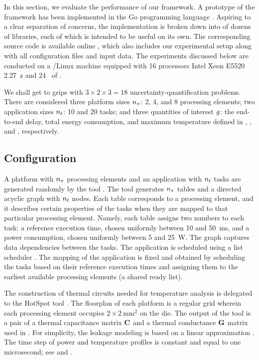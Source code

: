 In this section, we evaluate the performance of our framework. A prototype of
the framework has been implemented in the Go programming language \cite{go}.
Aspiring to a clear separation of concerns, the implementation is broken down
into of dozens of libraries, each of which is intended to be useful on its own.
The corresponding source code is available online \cite{sources}, which also
includes our experimental setup along with all configuration files and input
data. The experiments discussed below are conducted on a /Linux machine
equipped with 16 processors Intel Xeon E5520 2.27~z and 24~ of
.

We shall get to grips with $3 \times 2 \times 3 = 18$ uncertainty-quantification
problems. There are considered three platform sizes ${n_\pi}$: 2, 4, and 8
processing elements; two application sizes ${n_t}$: 10 and 20 tasks; and three
quantities of interest $g$: the end-to-end delay, total energy consumption, and
maximum temperature defined in , , and
, respectively.

\subsection{Configuration}

A platform with ${n_\pi}$ processing elements and an application with ${n_t}$ tasks
are generated randomly by the  tool \cite{dick1998}. The tool generates
${n_\pi}$ tables and a directed acyclic graph with ${n_t}$ nodes. Each table
corresponds to a processing element, and it describes certain properties of the
tasks when they are mapped to that particular processing element. Namely, each
table assigns two numbers to each task: a reference execution time, chosen
uniformly between 10 and 50~ms, and a power consumption, chosen uniformly
between 5 and 25~W. The graph captures data dependencies between the tasks. The
application is scheduled using a list scheduler \cite{adam1974}. The mapping of
the application is fixed and obtained by scheduling the tasks based on their
reference execution times and assigning them to the earliest available
processing elements (a shared ready list).

The construction of thermal  circuits needed for temperature analysis is
delegated to the HotSpot tool \cite{skadron2004}. The floorplan of each platform
is a regular grid wherein each processing element occupies $2 \times
2~\text{mm}^2$ on the die. The output of the tool is a pair of a thermal
capacitance matrix $\mathbf{C}$ and a thermal conductance $\mathbf{G}$ matrix used in
. For simplicity, the leakage modeling is based on a linear
approximation \cite{yang2013, ukhov2012, liu2007}. The time step of power and
temperature profiles is constant and equal to one microsecond; see 
and .

